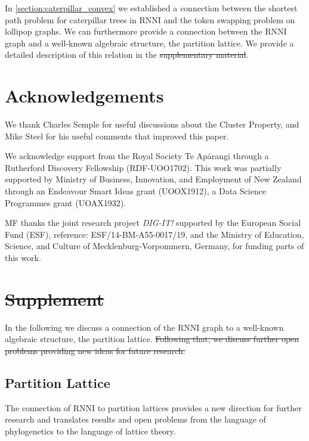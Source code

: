 \documentclass[11pt]{amsart}
\newcommand{\rnni}{\mathrm{RNNI}}
\newcommand{\summary}[1]{} %
\providecommand{\DIFaddtex}[1]{{\protect\color{blue}\uwave{#1}}} %
\providecommand{\DIFdeltex}[1]{{\protect\color{red}\sout{#1}}}                      %
\providecommand{\DIFaddbegin}{} %
\providecommand{\DIFaddend}{} %
\providecommand{\DIFdelbegin}{} %
\providecommand{\DIFdelend}{} %
\providecommand{\DIFadd}[1]{\texorpdfstring{\DIFaddtex{#1}}{#1}} %
\providecommand{\DIFdel}[1]{\texorpdfstring{\DIFdeltex{#1}}{}} %
\newcommand{\DIFscaledelfig}{0.5}
\newlength{\DIFdelgraphicswidth} %
\newlength{\DIFdelgraphicsheight} %
\newcommand{\DIFaddincludegraphics}[2][]{{\color{blue}\fbox{\DIFOincludegraphics[#1]{#2}}}} %
\newcommand{\DIFdelincludegraphics}[2][]{%
\sbox{\DIFdelgraphicsbox}{\DIFOincludegraphics[#1]{#2}}%
\settoboxwidth{\DIFdelgraphicswidth}{\DIFdelgraphicsbox} %
\settoboxtotalheight{\DIFdelgraphicsheight}{\DIFdelgraphicsbox} %
\scalebox{\DIFscaledelfig}{%
\parbox[b]{\DIFdelgraphicswidth}{\usebox{\DIFdelgraphicsbox}\\[-\baselineskip] \rule{\DIFdelgraphicswidth}{0em}}\llap{\resizebox{\DIFdelgraphicswidth}{\DIFdelgraphicsheight}{%
\setlength{\unitlength}{\DIFdelgraphicswidth}%
\begin{picture}(1,1)%
\thicklines\linethickness{2pt} %
{\color[rgb]{1,0,0}\put(0,0){\framebox(1,1){}}}%
{\color[rgb]{1,0,0}\put(0,0){\line( 1,1){1}}}%
{\color[rgb]{1,0,0}\put(0,1){\line(1,-1){1}}}%
\end{picture}%
}\hspace*{3pt}}} %
} %
\DeclareRobustCommand{\DIFaddbegin}{\DIFOaddbegin \let\includegraphics\DIFaddincludegraphics} %
\DeclareRobustCommand{\DIFaddend}{\DIFOaddend \let\includegraphics\DIFOincludegraphics} %
\DeclareRobustCommand{\DIFdelbegin}{\DIFOdelbegin \let\includegraphics\DIFdelincludegraphics} %
\DeclareRobustCommand{\DIFdelend}{\DIFOaddend \let\includegraphics\DIFOincludegraphics} %
\begin{document}
\DIFdelbegin \DIFdel{\summary{partition lattice -- can be found in supplement}
}\DIFdelend \DIFaddbegin \DIFadd{\summary{partition lattice -- can be found in appendix}
}\DIFaddend In \autoref{section:caterpillar_convex} we established a connection between the shortest path problem for caterpillar trees in $\rnni$ and the token swapping problem on lollipop graphs.
We can furthermore provide a connection between the $\rnni$ graph and a well-known algebraic structure, the partition lattice.
We provide a detailed description of this relation in the \DIFdelbegin \DIFdel{supplementary material}\DIFdelend \DIFaddbegin \DIFadd{appendix}\DIFaddend .


\section*{Acknowledgements}
We thank Charles Semple for useful discussions about the Cluster Property, and Mike Steel for his useful comments that improved this paper.

We acknowledge support from the Royal Society Te Ap\=arangi through a Rutherford Discovery Fellowship (RDF-UOO1702).
This work was partially supported by Ministry of Business, Innovation, and Employment of New Zealand through an Endeavour Smart Ideas grant (UOOX1912), a Data Science Programmes grant (UOAX1932).

MF thanks the joint research project \textit{DIG-IT!} supported by the European Social Fund (ESF), reference: ESF/14-BM-A55-0017/19, and the Ministry of Education, Science, and Culture of Mecklenburg-Vorpommern, Germany, for funding parts of this work.


\printbibliography


\section{\DIFdelbegin \DIFdel{Supplement}\DIFdelend \DIFaddbegin \DIFadd{Appendix}\DIFaddend }

In the following we discuss a connection of the $\rnni$ graph to a well-known algebraic structure, the partition lattice.
\DIFdelbegin \DIFdel{Following that, we discuss further open problems providing new ideas for future research.
}\DIFdelend 

\subsection{Partition Lattice}
The connection of $\rnni$ to partition lattices provides a new direction for further research and translates results and open problems from the language of phylogenetics to the language of lattice theory.
\end{document}

